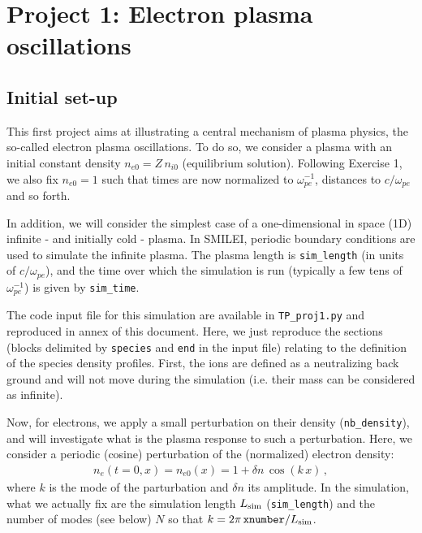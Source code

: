 \documentclass[10pt]{article}
\begin{document}
\newpage
\section{Project 1: Electron plasma oscillations}\label{proj1}

\subsection{Initial set-up}

This first project aims at illustrating a central mechanism of plasma physics, the so-called electron plasma oscillations.
To do so, we consider a plasma with an initial  constant density $n_{e0} = Z\,n_{i0}$ (equilibrium solution).
Following Exercise 1, we also fix $n_{e0}=1$ such that times are now normalized to $\omega_{pe}^{-1}$, distances to $c/\omega_{pe}$ and so forth.

In addition, we will consider the simplest case of a one-dimensional in space (1D) infinite - and initially cold - plasma.
In SMILEI, periodic boundary conditions are used to simulate the infinite plasma.
The plasma length is \texttt{sim\_length}  (in units of $c/\omega_{pe}$), and the time over which the simulation is run (typically a few tens of $\omega_{pe}^{-1}$) is given by \texttt{sim\_time}. 

The code input file for this simulation are available in \texttt{TP\_proj1.py} and reproduced in annex of this document.
Here, we just reproduce the sections (blocks delimited by \texttt{species} and \texttt{end} in the input file) relating to the definition of the species density profiles. 
First, the ions are defined as a neutralizing back ground and will not move during the simulation (i.e. their mass can be considered as infinite).




Now, for electrons, we apply a small perturbation on their density (\texttt{nb\_density}), and will investigate what is the plasma response to such a perturbation.
Here, we consider a periodic (cosine) perturbation of the (normalized) electron density:
\begin{eqnarray}\label{eq_pert}
n_e(t=0,x) = n_{e0}(x) = 1 + \delta n\,\cos(k\,x)\,,
\end{eqnarray}
where $k$ is the mode of the parturbation and $\delta n$ its amplitude. 
In the simulation, what we actually fix are the simulation length $L_{\rm sim}$ (\texttt{sim\_length}) and the number of modes (see below) $N$ so that $k=2\pi\,\mathtt{xnumber}/L_{\rm sim}$.
\end{document}
